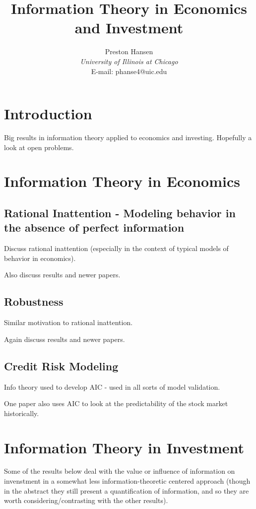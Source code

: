 \documentclass[10pt, twocolumn]{IEEEtran}
\begin{document}
\title{Information Theory in Economics and Investment}
\author{Preston Hansen\\
{\it University of Illinois at Chicago} \\
E-mail: phanse4@uic.edu}
\maketitle

\begin{abstract}
\end{abstract}

\section{Introduction}

Big results in information theory applied to economics and investing. Hopefully a look at open problems.

\section{Information Theory in Economics}

\subsection{Rational Inattention - Modeling behavior in the absence of perfect information}
Discuss rational inattention (especially in the context of typical models of behavior in economics).

Also discuss results and newer papers.
\subsection{Robustness}
Similar motivation to rational inattention.

Again discuss results and newer papers.
\subsection{Credit Risk Modeling}
Info theory used to develop AIC - used in all sorts of model validation.

One paper also uses AIC to look at the predictability of the stock market historically.
\section{Information Theory in Investment}
Some of the results below deal with the value or influence of information on invenstment in a
somewhat less information-theoretic centered approach (though in the abstract they still present
a quantification of information, and so they are worth considering/contrasting with the other
results).
\end{document}
